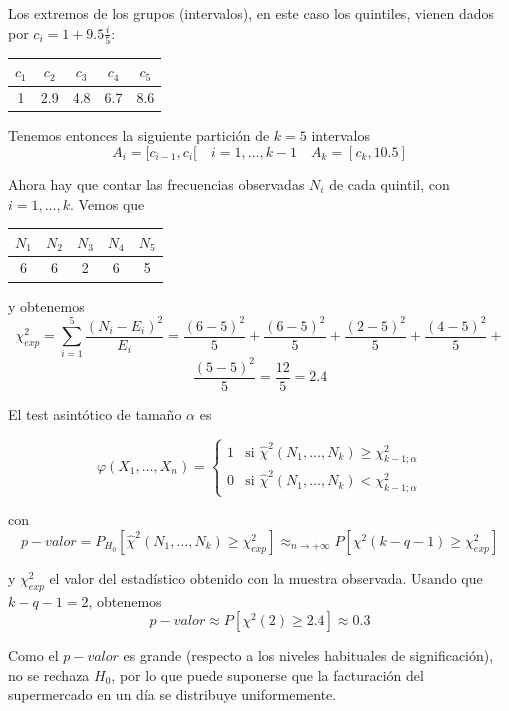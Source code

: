\documentclass[12pt]{article}
\begin{document}
\begin{ejercicio}[1.5 puntos]
\begin{enumerate}
            Los extremos de los grupos (intervalos), en este caso los quintiles, vienen dados por $c_i = 1 + 9.5 \frac{i}{5}$:
            
            \begin{center}
                \begin{tabular}{c|c|c|c|c}
                    $c_1$ & $c_2$ & $c_3$ & $c_4$ & $c_5$ \\
                    \hline
                    1 & 2.9 & 4.8 & 6.7 & 8.6
                \end{tabular}
            \end{center}

            Tenemos entonces la siguiente partición de $k=5$ intervalos $$A_i = [c_{i-1}, c_{i}[ \quad i = 1, \ldots, k-1 \quad A_k = [c_{k}, 10.5]$$

            Ahora hay que contar las frecuencias observadas $N_i$ de cada quintil, con \\ $i = 1, \ldots, k$. Vemos que
            \begin{center}
                \begin{tabular}{c|c|c|c|c}
                    $N_1$ & $N_2$ & $N_3$ & $N_4$ & $N_5$ \\
                    \hline
                    6 & 6 & 2 & 6 & 5
                \end{tabular}
            \end{center}

            y obtenemos $$\chi^2_{exp} = \sum_{i=1}^{5} \dfrac{(N_i - E_i)^2}{E_i} = \dfrac{(6 - 5)^2}{5} + \dfrac{(6 - 5)^2}{5} +
            \dfrac{(2 - 5)^2}{5} + \dfrac{(4 - 5)^2}{5} + $$$$\dfrac{(5 - 5)^2}{5} = \dfrac{12}{5} = 2.4$$

            El test asintótico de tamaño $\alpha$ es

            $$\varphi(X_1, \ldots, X_n) = \begin{cases}
                1 &\text{si } \hat{\chi}^2(N_1, \ldots, N_k) \geqslant \chi^2_{k-1;\alpha} \\
                0 &\text{si } \hat{\chi}^2(N_1, \ldots, N_k) < \chi^2_{k-1;\alpha}
            \end{cases}$$

            con $$p-valor = P_{H_0}[\hat{\chi}^2(N_1, \ldots, N_k) \geqslant \chi^2_{exp}] \approx_{n \to +\infty} P[\chi^2(k-q-1) \geqslant \chi^2_{exp}]$$

            y $\chi^2_{exp}$ el valor del estadístico obtenido con la muestra observada. Usando que $k-q-1=2$, obtenemos
            $$p-valor \approx P[\chi^2(2) \geqslant 2.4] \approx 0.3$$

            Como el $p-valor$ es grande (respecto a los niveles habituales de significación), no se rechaza $H_0$, por lo que 
            puede suponerse que la facturación del supermercado en un día se distribuye uniformemente.

        \end{enumerate}
    \end{ejercicio}
\end{document}
